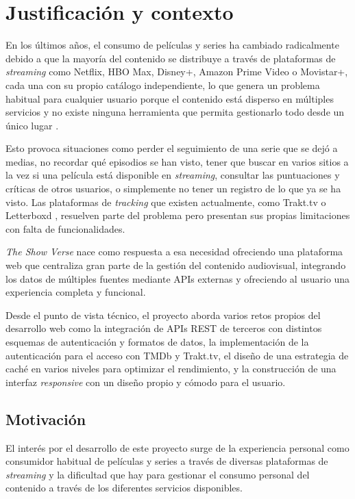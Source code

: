 \section{Justificación y contexto}

En los últimos años, el consumo de películas y series ha cambiado radicalmente debido a que la mayoría del contenido se distribuye a través de plataformas de \textit{streaming} como Netflix, HBO Max, Disney+, Amazon Prime Video o Movistar+, cada una con su propio catálogo independiente, lo que genera un problema habitual para cualquier usuario porque el contenido está disperso en múltiples servicios y no existe ninguna herramienta que permita gestionarlo todo desde un único lugar \parencite{CNMC:2025}.

Esto provoca situaciones como perder el seguimiento de una serie que se dejó a medias, no recordar qué episodios se han visto, tener que buscar en varios sitios a la vez si una película está disponible en \textit{streaming}, consultar las puntuaciones y críticas de otros usuarios, o simplemente no tener un registro de lo que ya se ha visto. Las plataformas de \textit{tracking} que existen actualmente, como Trakt.tv \parencite{Trakt:2024} o Letterboxd \parencite{Letterboxd:2024}, resuelven parte del problema pero presentan sus propias limitaciones con falta de funcionalidades.

\textit{The Show Verse} nace como respuesta a esa necesidad ofreciendo una plataforma web que centraliza gran parte de la gestión del contenido audiovisual, integrando los datos de múltiples fuentes mediante APIs externas y ofreciendo al usuario una experiencia completa y funcional.

Desde el punto de vista técnico, el proyecto aborda varios retos propios del desarrollo web como la integración de APIs REST de terceros con distintos esquemas de autenticación y formatos de datos, la implementación de la autenticación para el acceso con TMDb y Trakt.tv, el diseño de una estrategia de caché en varios niveles para optimizar el rendimiento, y la construcción de una interfaz \textit{responsive} con un diseño propio y cómodo para el usuario.

\subsection{Motivación}

El interés por el desarrollo de este proyecto surge de la experiencia personal como consumidor habitual de películas y series a través de diversas plataformas de \textit{streaming} y la dificultad que hay para gestionar el consumo personal del contenido a través de los diferentes servicios disponibles.

